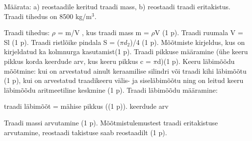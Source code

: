 
Määrata: a) reostaadile keritud traadi mass, b) reostaadi traadi eritakistus. Traadi tihedus on 8500 kg/m$^3$.

\hint

\solu
Traadi tihedus: $\rho$ = m/V , kus traadi mass m = $\rho$V (1 p). Traadi ruumala V = Sl (1 p). Traadi ristlõike pindala S = ($\pi$$d_2$)/4 (1 p). Mõõtmiste kirjeldus, kus on kirjeldatud ka kolmnurga kasutamist(1 p). Traadi pikkuse määramine (ühe keeru pikkus korda keerdude arv, kus keeru pikkus c = $\pi$d)(1 p). Keeru läbimõõdu mõõtmine: kui on arvestatud ainult keraamilise silindri või traadi kihi läbimõõtu (1 p), kui on arvestatud traadikeeru välis- ja siseläbimõõtu ning on leitud keeru läbimõõdu aritmeetiline keskmine (1 p). Traadi läbimõõdu määramine:

traadi läbimõõt = mähise pikkus ((1 p)). keerdude arv

Traadi massi arvutamine (1 p). Mõõtmistulemustest traadi eritakistuse arvutamine, reostaadi takistuse saab reostaadilt (1 p).
\probend
